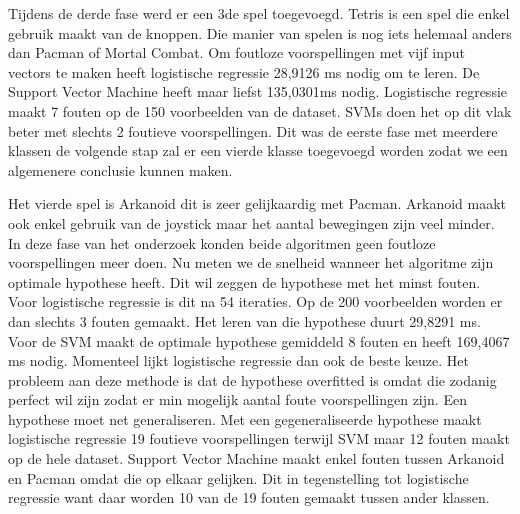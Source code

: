 Tijdens de derde fase werd er een 3de spel toegevoegd. Tetris is een spel die enkel gebruik maakt van de knoppen. Die manier van spelen is nog iets helemaal anders dan Pacman of Mortal Combat. Om foutloze voorspellingen met vijf input vectors te maken heeft logistische regressie 28,9126 ms nodig om te leren. De Support Vector Machine heeft maar liefst 135,0301ms nodig. Logistische regressie maakt 7 fouten op de 150 voorbeelden van de dataset. SVMs doen het op dit vlak beter met slechts 2 foutieve voorspellingen. Dit was de eerste fase met meerdere klassen de volgende stap zal er een vierde klasse toegevoegd worden zodat we een algemenere conclusie kunnen maken. 

Het vierde spel is Arkanoid dit is zeer gelijkaardig met Pacman. Arkanoid maakt ook enkel gebruik van de joystick maar het aantal bewegingen zijn veel minder. In deze fase van het onderzoek konden beide algoritmen geen foutloze voorspellingen meer doen. Nu meten we de snelheid wanneer het algoritme zijn optimale hypothese heeft. Dit wil zeggen de hypothese met het minst fouten. Voor logistische regressie is dit na 54 iteraties. Op de 200 voorbeelden worden er dan slechts 3 fouten gemaakt. Het leren van die hypothese duurt 29,8291 ms. Voor de SVM maakt de optimale hypothese gemiddeld 8 fouten en heeft 169,4067 ms nodig. 
Momenteel lijkt logistische regressie dan ook de beste keuze. Het probleem aan deze methode is dat de hypothese overfitted is omdat die zodanig perfect wil zijn zodat er min mogelijk aantal foute voorspellingen zijn. Een hypothese moet net generaliseren. 
Met een gegeneraliseerde hypothese maakt logistische regressie 19 foutieve voorspellingen  terwijl SVM maar 12 fouten maakt op de hele dataset. Support Vector Machine maakt enkel fouten tussen Arkanoid en Pacman omdat die op elkaar gelijken. Dit in tegenstelling tot logistische regressie want daar worden 10 van de 19 fouten gemaakt tussen ander klassen.